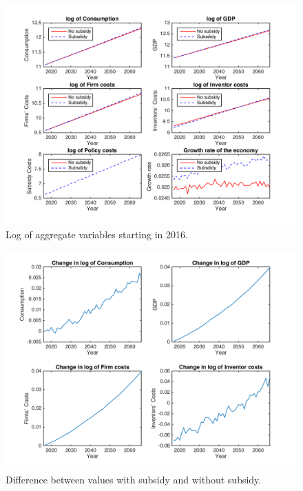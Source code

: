 \documentclass[a4paper,11pt]{article}
\begin{document}
\begin{figure}[h!]
\centering
\includegraphics[scale=.6]{figures/aggregates2016NC}
\caption{Log of aggregate variables starting in 2016.}
\end{figure}

\begin{figure}[h!]
\centering
\includegraphics[scale=.6]{figures/aggregates2016_diffNC}
\caption{Difference between values with subsidy and without subsidy.}
\end{figure}
\end{document}

